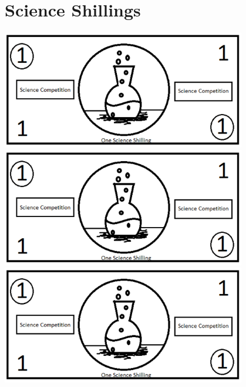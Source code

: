 \chapter{Science Shillings}
\label{cha:sci-shillings}

\begin{center}
\includegraphics[width=0.8\textwidth]{./img/science-shilling.png}
\vfill
\includegraphics[width=0.8\textwidth]{./img/science-shilling.png}
\vfill
\includegraphics[width=0.8\textwidth]{./img/science-shilling.png}
\end{center}